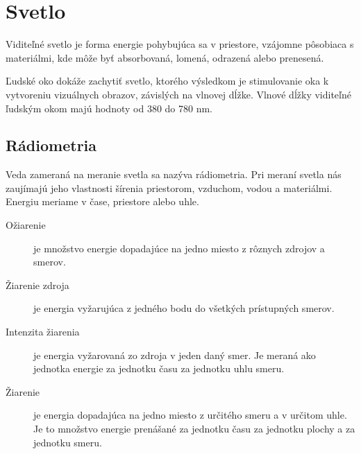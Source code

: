 \section{Svetlo}

Viditeľné svetlo je forma energie pohybujúca sa v priestore, vzájomne pôsobiaca
s materiálmi, kde môže byť absorbovaná, lomená, odrazená alebo prenesená.

Ľudské oko dokáže zachytiť svetlo, ktorého výsledkom je stimulovanie oka k vytvoreniu
vizuálnych obrazov, závislých na vlnovej dĺžke. Vlnové dĺžky viditeľné ľudským okom
majú hodnoty od 380 do 780 nm. \cite{AHDR}

\subsection*{Rádiometria}

Veda zameraná na meranie svetla sa nazýva rádiometria. Pri meraní svetla nás zaujímajú
jeho vlastnosti šírenia priestorom, vzduchom, vodou a materiálmi. Energiu meriame v čase,
priestore alebo uhle.

\begin{description}
    \item [Ožiarenie] je množstvo energie dopadajúce na jedno miesto z rôznych zdrojov a smerov.
    \item [Žiarenie zdroja] je energia vyžarujúca z jedného bodu do všetkých prístupných smerov.
    \item [Intenzita žiarenia] je energia vyžarovaná zo zdroja v jeden daný smer. Je meraná ako
    jednotka energie za jednotku času za jednotku uhlu smeru.
    \item [Žiarenie] je energia dopadajúca na jedno miesto z určitého smeru a v určitom uhle.
    Je to množstvo energie prenášané za jednotku času za jednotku plochy a za jednotku smeru.
\end{description}

